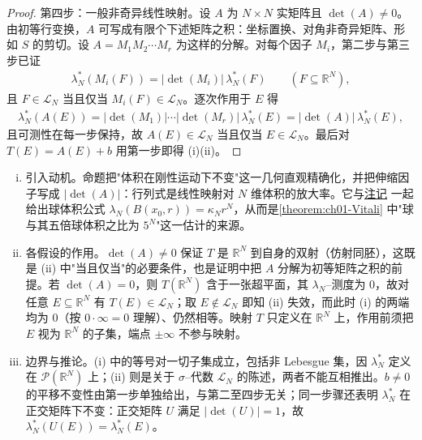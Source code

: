 \documentclass[../../main.tex]{subfiles}%
\begin{document}
\begin{proof}
第四步：一般非奇异线性映射。设 $A$ 为 $N\times N$ 实矩阵且 $\det(A)\neq0$。由初等行变换，$A$ 可写成有限个下述矩阵之积：坐标置换、对角非奇异矩阵、形如 $S$ 的剪切。设 $A=M_1M_2\cdots M_r$ 为这样的分解。对每个因子 $M_i$，第二步与第三步已证
\begin{align*}
\lambda_N^*(M_i(F))=|\det(M_i)|\,\lambda_N^*(F)\qquad(F\subseteq\mathbb{R}^N),
\end{align*}
且 $F\in\mathcal{L}_N$ 当且仅当 $M_i(F)\in\mathcal{L}_N$。逐次作用于 $E$ 得
\begin{align*}
\lambda_N^*(A(E))=|\det(M_1)|\cdots|\det(M_r)|\,\lambda_N^*(E)=|\det(A)|\,\lambda_N^*(E),
\end{align*}
且可测性在每一步保持，故 $A(E)\in\mathcal{L}_N$ 当且仅当 $E\in\mathcal{L}_N$。最后对 $T(E)=A(E)+b$ 用第一步即得 (i)(ii)。
\end{proof}

\begin{remark}\label{remark:ch01-仿射变换条件}
\begin{enumerate}[(i)]
\item 引入动机。命题把"体积在刚性运动下不变"这一几何直观精确化，并把伸缩因子写成 $|\det(A)|$：行列式是线性映射对 $N$ 维体积的放大率。它与\hyperref[remark:ch01-位似]{注记} 一起给出球体积公式 $\lambda_N(B(x_0,r))=\kappa_Nr^N$，从而是\cref{theorem:ch01-Vitali} 中"球与其五倍球体积之比为 $5^N$"这一估计的来源。
\item 各假设的作用。$\det(A)\neq0$ 保证 $T$ 是 $\mathbb{R}^N$ 到自身的双射（仿射同胚），这既是 (ii) 中"当且仅当"的必要条件，也是证明中把 $A$ 分解为初等矩阵之积的前提。若 $\det(A)=0$，则 $T(\mathbb{R}^N)$ 含于一张超平面，其 $\lambda_N$--测度为 $0$，故对任意 $E\subseteq\mathbb{R}^N$ 有 $T(E)\in\mathcal{L}_N$；取 $E\notin\mathcal{L}_N$ 即知 (ii) 失效，而此时 (i) 的两端均为 $0$（按 $0\cdot\infty=0$ 理解）、仍然相等。映射 $T$ 只定义在 $\mathbb{R}^N$ 上，作用前须把 $E$ 视为 $\mathbb{R}^N$ 的子集，端点 $\pm\infty$ 不参与映射。
\item 边界与推论。(i) 中的等号对一切子集成立，包括非 Lebesgue 集，因 $\lambda_N^*$ 定义在 $\mathcal{P}(\mathbb{R}^N)$ 上；(ii) 则是关于 $\sigma$--代数 $\mathcal{L}_N$ 的陈述，两者不能互相推出。$b\neq0$ 的平移不变性由第一步单独给出，与第二至四步无关；同一步骤还表明 $\lambda_N^*$ 在正交矩阵下不变：正交矩阵 $U$ 满足 $|\det(U)|=1$，故 $\lambda_N^*(U(E))=\lambda_N^*(E)$。
\end{enumerate}
\end{remark}
\end{document}

